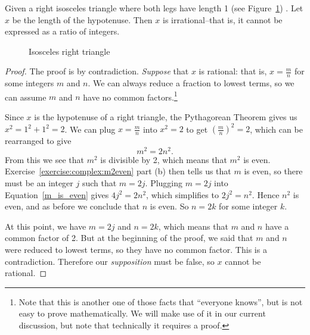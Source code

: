 \begin{prop}\label{proposition:complex:irrational}
Given a right isosceles triangle where both legs have length 1 (see Figure~\ref{fig:complex:isosceles_right}) .  Let $x$ be the length of the hypotenuse.  Then $x$ is irrational--that is, it cannot be expressed as a ratio of integers. 
\end{prop}
\begin{figure}[htb]
	  \caption{\label{fig:complex:isosceles_right} Isosceles right triangle }
\end{figure}
\begin{proof}
The proof is by contradiction.   \emph{Suppose} that $x$ is rational: that is, $x = \frac{m}{n}$ for some integers $m$ and $n$. We can always reduce a fraction to lowest terms, so we can assume $m$ and $n$ have no common factors.\footnote{Note that this is another one of those facts that ``everyone knows'', but is not easy to prove mathematically. We will make use of it in our current discussion, but note that technically it requires a proof.} 

Since $x$ is the hypotenuse of a right triangle, the Pythagorean Theorem gives us $x^2 = 1^2 + 1^2 = 2$.
We can plug $x=\frac{m}{n}$ into $x^2 = 2$ to get $\left(\frac{m}{n}\right) ^2 = 2$, which can be rearranged to give 
\begin{equation}\label{m_is_even}
m^2 = 2n^2.
\end{equation}
From this we see that $m^2$  is divisible by 2, which means that $m^2$ is even. Exercise~\ref{exercise:complex:m2even} part (b) then tells us that $m$ is even, so there must be an integer $j$ such that  $m = 2j$.  Plugging $m=2j$ into Equation~\ref{m_is_even} gives $4j^2 = 2n^2$, which simplifies to $2j^2 = n^2$.  Hence $ n^2$ is even, and as before we conclude that $n$ is even.  So $n = 2k$ for some integer $k$.

At this point, we have $m = 2j$ and $n = 2k$, which means that $m$ and $n$ have a common factor of 2.  But at the beginning of the proof, we said that  $m$ and $n$ were reduced to lowest terms, so they  have no common factor.  This is a contradiction.  Therefore our \emph{supposition} must be false, so $x$ cannot be rational.
\end{proof}

